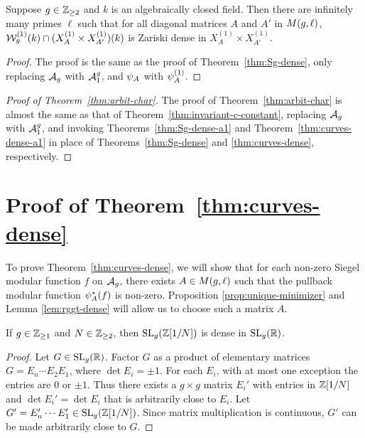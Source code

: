\documentclass{amsart}
\begin{document}
\begin{theorem}\label{thm:Sg-dense-a1}
  Suppose $g\in\mathbb{Z}_{\ge 2}$ and $k$ is an algebraically closed field. Then there are infinitely many primes $\ell$ such that for all diagonal matrices $A$ and $A'$ in $M(g,\ell)$, $\mathcal{W}_g^{(1)}(k) \cap (X^{(1)}_A \times X^{(1)}_{A'})(k)$ is Zariski dense in $X^{(1)}_A \times X^{(1)}_{A'}$.
\end{theorem}

\begin{proof}
  The proof is the same as the proof of Theorem~\ref{thm:Sg-dense}, only replacing $\mathcal{A}_g$ with $\mathcal{A}_1^g$, and $\psi_{A}$ with $\psi_{A}^{(1)}$.
\end{proof}

\begin{proof}[Proof of Theorem~\ref{thm:arbit-char}]
  The proof of Theorem~\ref{thm:arbit-char} is almost the same as that of Theorem~\ref{thm:invariant-c-constant}, replacing $\mathcal{A}_g$  with $\mathcal{A}_1^g$, and invoking Theorems~\ref{thm:Sg-dense-a1} and  Theorem~\ref{thm:curves-dense-a1} in place of Theorems~\ref{thm:Sg-dense} and \ref{thm:curves-dense}, respectively.
\end{proof}








\section{Proof of Theorem~\ref{thm:curves-dense}}
\label{sec:step-1}

To prove Theorem~\ref{thm:curves-dense}, we will show that for each non-zero Siegel modular function $f$ on $\mathcal{A}_g$, there exists $A \in M(g,\ell)$ such that the pullback modular function $\psi_{A}^*(f)$ is non-zero.
Proposition \ref{prop:unique-minimizer} and Lemma \ref{lem:rggt-dense} will allow us to choose such a matrix $A$.


\begin{lemma}\label{lem:sl-dense}
  If $g\in\mathbb{Z}_{\ge 1}$ and $N\in\mathbb{Z}_{\ge 2}$, then $\operatorname{SL}_g(\mathbb{Z}[1/N])$ is dense in $\operatorname{SL}_g(\mathbb{R})$.
\end{lemma}
\begin{proof}
  Let $G \in \operatorname{SL}_g(\mathbb{R})$. Factor $G$ as a product of elementary matrices $G = E_n \cdots E_2 E_1$, where $\det E_i = \pm 1$. For each $E_i$, with at most one exception the entries are $0$ or $\pm 1$. Thus there exists a $g \times g$ matrix $E_i'$ with entries in $\mathbb{Z}[1/N]$ and $\det E_i' = \det E_i$ that is arbitrarily close to $E_i$. Let $G' = E_n' \cdots E_1' \in \operatorname{SL}_g(\mathbb{Z}[1/N])$. Since matrix multiplication is continuous, $G'$ can be made arbitrarily close to $G$.
\end{proof}
\end{document}
